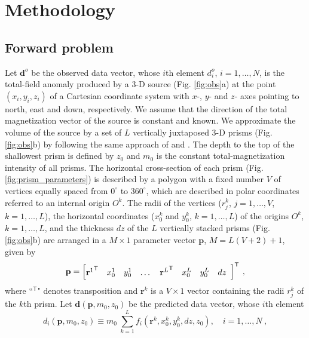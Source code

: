 \section{Methodology}\label{sec:metodo}

\subsection{Forward problem}

Let $\mathbf{d}^{o}$ be the observed data vector, whose $i$th element $d^{o}_{i}$, $i = 1, \dots, N$, is the total-field anomaly produced by a 3-D source (Fig. \ref{fig:obs}a) at the point $(x_{i}, y_{i}, z_{i})$ of a Cartesian coordinate system with $x$-, $y$- and $z$- axes pointing to north, east and down, respectively. We assume that the direction of the total magnetization vector of the source is constant and known. We approximate the volume of the source by a set of $L$ vertically juxtaposed 3-D prisms (Fig. \ref{fig:obs}b) by following the same approach of \cite{oliveirajr-etal2011} and \cite{oliveirajr-barbosa2013}. The depth to the top of the shallowest prism is defined by $z_{0}$ and $m_{0}$ is the constant total-magnetization intensity of all prisms. The horizontal cross-section of each prism (Fig. \ref{fig:prism_parameters}) 
is described by a polygon with a fixed number $V$ of vertices equally spaced from $0^{\circ}$ to $360^{\circ}$, which are described in polar coordinates referred to an internal origin $O^{k}$. The radii of the vertices ($r^{k}_{j}$, $j=1,\dots , V$, $k=1,\dots ,L$), the horizontal coordinates ($x_{0}^{k}$ and $y_{0}^{k}$, $k=1,\dots ,L$) of the origins $O^{k}$, $k=1,\dots ,L$, and the thickness $dz$ of the $L$ vertically stacked prisms (Fig. \ref{fig:obs}b) are arranged in a $M \times 1$ parameter vector $\mathbf{p}$, $M = L (V + 2) + 1$, given by
\begin{equation}
\mathbf{p} = \left[ \begin{array}{@{}*{12}{c}@{}}
{\mathbf{r}^{1}}^{\mathsf{T}} & x_{0}^{1} & y_{0}^{1} & \dots & {\mathbf{r}^{L}}^{\mathsf{T}} & x_{0}^{L} & y_{0}^{L} & dz \\
\end{array} \right]^{\mathsf{T}} \: ,
\label{eq:p-vector}
\end{equation}
where ``$^{\mathsf{T}}$" denotes transposition and $\mathbf{r}^{k}$ is a $V \times 1$ vector containing the radii $r^{k}_{j}$ 
of the $k$th prism.
Let $\mathbf{d} (\mathbf{p}, m_{0}, z_{0})$ be the predicted data vector, 
whose $i$th element 
\begin{equation}
d_{i} (\mathbf{p}, m_{0}, z_{0}) \equiv m_{0} \: \sum\limits_{k=1}^{L} f_{i}(\mathbf{r}^{k}, x_{0}^{k}, y_{0}^{k}, dz, z_{0}), \quad i = 1, \dots, N \: ,
\label{eq:predicted-data-i}
\end{equation}
